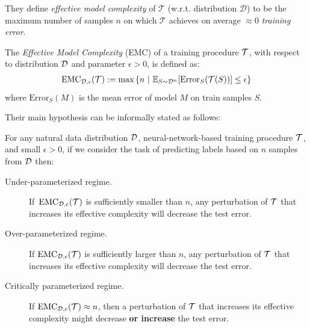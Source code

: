 They define \emph{effective model complexity} of $\mathcal{T}$ (w.r.t. distribution $\mathcal D$) to be the maximum number of samples $n$ on which $\mathcal{T}$ achieves on average $\approx 0$ \emph{training error}. 

\newcommand{\EMC}{\mathrm{EMC}}
\begin{definition}
The \emph{Effective Model Complexity} (EMC) of a training procedure $\mathcal{T}$, with respect to distribution $\mathcal{D}$ and parameter $\epsilon>0$,
is defined as:
\begin{align*}
    \EMC_{\cD,\eps}(\cT)
    :=  \max \left\{n ~|~ \E_{S \sim \cD^n}[ \mathrm{Error}_S( \cT( S )  ) ] \leq \eps \right\}
    \end{align*}
    where $\mathrm{Error}_S(M)$ is the mean error of model $M$ on train samples $S$.
\end{definition}

Their main hypothesis can be informally stated as follows:

\begin{hypothesis} \label{hyp:informaldd}
For any natural data distribution $\mathcal{D}$, neural-network-based training procedure $\mathcal{T}$, and small $\epsilon>0$,
if we consider the task of predicting labels based on  $n$ samples from $\mathcal{D}$ then:
\begin{description}
    \item[Under-parameterized regime.]  If~$\EMC_{\cD,\epsilon}(\cT)$ is sufficiently smaller than $n$, any perturbation of $\mathcal{T}$ that increases its effective complexity will decrease the test error.
    \item[Over-parameterized regime.] If $\EMC_{\cD,\epsilon}(\cT)$ is sufficiently larger than $n$,
    any perturbation of $\mathcal{T}$ that increases its effective complexity will decrease the test error.
    
    \item[Critically parameterized regime.] If $\EMC_{\cD,\epsilon}(\cT) \approx n$, then
    a perturbation of $\mathcal{T}$ that increases its effective complexity
    might decrease {\bf or increase} the test error.
\end{description}
\end{hypothesis}

